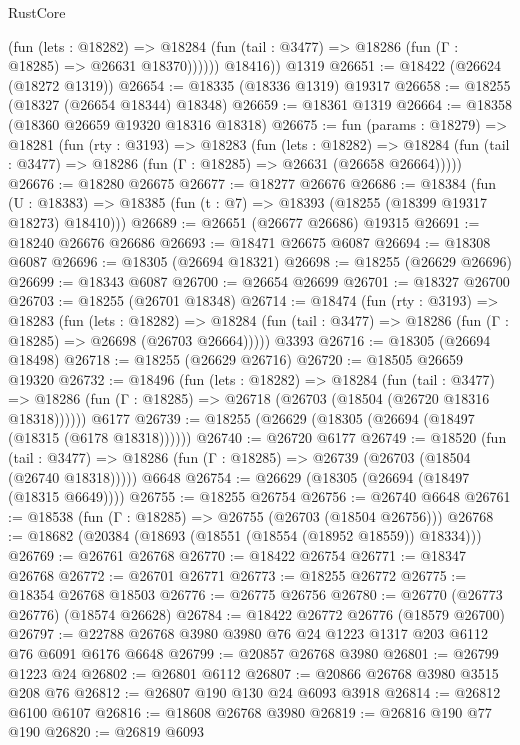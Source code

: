 \begin{lexlean}{RustCore}
\begin{coremodule}
              (fun (lets : @18282) =>
              @18284 (fun (tail : @3477) => @18286 (fun (Γ : @18285) => @26631 @18370))))))
        @18416))
    @1319
@26651 := @18422 (@26624 (@18272 @1319))
@26654 := @18335 (@18336 @1319) @19317
@26658 := @18255 (@18327 (@26654 @18344) @18348)
@26659 := @18361 @1319
@26664 := @18358 (@18360 @26659 @19320 @18316 @18318)
@26675 := fun (params : @18279) =>
  @18281
    (fun (rty : @3193) =>
    @18283
      (fun (lets : @18282) =>
      @18284 (fun (tail : @3477) => @18286 (fun (Γ : @18285) => @26631 (@26658 @26664)))))
@26676 := @18280 @26675
@26677 := @18277 @26676
@26686 := @18384
    (fun (U : @18383) => @18385 (fun (t : @7) => @18393 (@18255 (@18399 @19317 @18273) @18410)))
@26689 := @26651 (@26677 @26686) @19315
@26691 := @18240 @26676 @26686
@26693 := @18471 @26675 @6087
@26694 := @18308 @6087
@26696 := @18305 (@26694 @18321)
@26698 := @18255 (@26629 @26696)
@26699 := @18343 @6087
@26700 := @26654 @26699
@26701 := @18327 @26700
@26703 := @18255 (@26701 @18348)
@26714 := @18474
    (fun (rty : @3193) =>
    @18283
      (fun (lets : @18282) =>
      @18284 (fun (tail : @3477) => @18286 (fun (Γ : @18285) => @26698 (@26703 @26664)))))
    @3393
@26716 := @18305 (@26694 @18498)
@26718 := @18255 (@26629 @26716)
@26720 := @18505 @26659 @19320
@26732 := @18496
    (fun (lets : @18282) =>
    @18284
      (fun (tail : @3477) =>
      @18286 (fun (Γ : @18285) => @26718 (@26703 (@18504 (@26720 @18316 @18318))))))
    @6177
@26739 := @18255 (@26629 (@18305 (@26694 (@18497 (@18315 (@6178 @18318))))))
@26740 := @26720 @6177
@26749 := @18520
    (fun (tail : @3477) => @18286 (fun (Γ : @18285) => @26739 (@26703 (@18504 (@26740 @18318)))))
    @6648
@26754 := @26629 (@18305 (@26694 (@18497 (@18315 @6649))))
@26755 := @18255 @26754
@26756 := @26740 @6648
@26761 := @18538 (fun (Γ : @18285) => @26755 (@26703 (@18504 @26756)))
@26768 := @18682 (@20384 (@18693 (@18551 (@18554 (@18952 @18559)) @18334)))
@26769 := @26761 @26768
@26770 := @18422 @26754
@26771 := @18347 @26768
@26772 := @26701 @26771
@26773 := @18255 @26772
@26775 := @18354 @26768 @18503
@26776 := @26775 @26756
@26780 := @26770 (@26773 @26776) (@18574 @26628)
@26784 := @18422 @26772 @26776 (@18579 @26700)
@26797 := @22788 @26768 @3980 @3980 @76 @24 @1223 @1317 @203 @6112 @76 @6091 @6176 @6648
@26799 := @20857 @26768 @3980
@26801 := @26799 @1223 @24
@26802 := @26801 @6112
@26807 := @20866 @26768 @3980 @3515 @208 @76
@26812 := @26807 @190 @130 @24 @6093 @3918
@26814 := @26812 @6100 @6107
@26816 := @18608 @26768 @3980
@26819 := @26816 @190 @77 @190
@26820 := @26819 @6093

\end{coremodule}
\end{lexlean}
